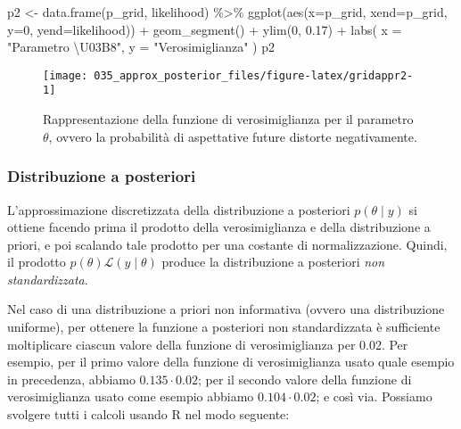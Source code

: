 \documentclass[
]{memoir}
\newenvironment{Shaded}{\begin{snugshade}}{\end{snugshade}}
\newcommand{\AttributeTok}[1]{\textcolor[rgb]{0.77,0.63,0.00}{#1}}
\newcommand{\DecValTok}[1]{\textcolor[rgb]{0.00,0.00,0.81}{#1}}
\newcommand{\FloatTok}[1]{\textcolor[rgb]{0.00,0.00,0.81}{#1}}
\newcommand{\FunctionTok}[1]{\textcolor[rgb]{0.00,0.00,0.00}{#1}}
\newcommand{\NormalTok}[1]{#1}
\newcommand{\OtherTok}[1]{\textcolor[rgb]{0.56,0.35,0.01}{#1}}
\newcommand{\SpecialCharTok}[1]{\textcolor[rgb]{0.00,0.00,0.00}{#1}}
\newcommand{\StringTok}[1]{\textcolor[rgb]{0.31,0.60,0.02}{#1}}
\begin{document}
\begin{Shaded}
\begin{Highlighting}[]
\NormalTok{p2 }\OtherTok{\textless{}{-}} \FunctionTok{data.frame}\NormalTok{(p\_grid, likelihood) }\SpecialCharTok{\%\textgreater{}\%}
  \FunctionTok{ggplot}\NormalTok{(}\FunctionTok{aes}\NormalTok{(}\AttributeTok{x=}\NormalTok{p\_grid, }\AttributeTok{xend=}\NormalTok{p\_grid, }\AttributeTok{y=}\DecValTok{0}\NormalTok{, }\AttributeTok{yend=}\NormalTok{likelihood)) }\SpecialCharTok{+}
  \FunctionTok{geom\_segment}\NormalTok{() }\SpecialCharTok{+}
  \FunctionTok{ylim}\NormalTok{(}\DecValTok{0}\NormalTok{, }\FloatTok{0.17}\NormalTok{) }\SpecialCharTok{+}
  \FunctionTok{labs}\NormalTok{(}
    \AttributeTok{x =} \StringTok{"Parametro \textbackslash{}U03B8"}\NormalTok{,}
    \AttributeTok{y =} \StringTok{"Verosimiglianza"}
\NormalTok{  )}
\NormalTok{p2}
\end{Highlighting}
\end{Shaded}

\begin{figure}

{\centering \texttt{[image: 035\_approx\_posterior\_files/figure-latex/gridappr2-1]} 

}

\caption{Rappresentazione della funzione di verosimiglianza per il parametro $\theta$, ovvero la probabilità di aspettative future distorte negativamente.}\label{fig:gridappr2}
\end{figure}

\hypertarget{distribuzione-a-posteriori}{%
\subsubsection{Distribuzione a posteriori}\label{distribuzione-a-posteriori}}

L'approssimazione discretizzata della distribuzione a posteriori \(p(\theta \mid y)\) si ottiene facendo prima il prodotto della verosimiglianza e della distribuzione a priori, e poi scalando tale prodotto per una costante di normalizzazione. Quindi, il prodotto \(p(\theta)\mathcal{L}(y \mid \theta)\) produce la distribuzione a posteriori \emph{non standardizzata}.

Nel caso di una distribuzione a priori non informativa (ovvero una distribuzione uniforme), per ottenere la funzione a posteriori non standardizzata è sufficiente moltiplicare ciascun valore della funzione di verosimiglianza per 0.02. Per esempio, per il primo valore della funzione di verosimiglianza usato quale esempio in precedenza, abbiamo \(0.135 \cdot 0.02\); per il secondo valore della funzione di verosimiglianza usato come esempio abbiamo \(0.104 \cdot 0.02\); e così via. Possiamo svolgere tutti i calcoli usando R nel modo seguente:
\end{document}
